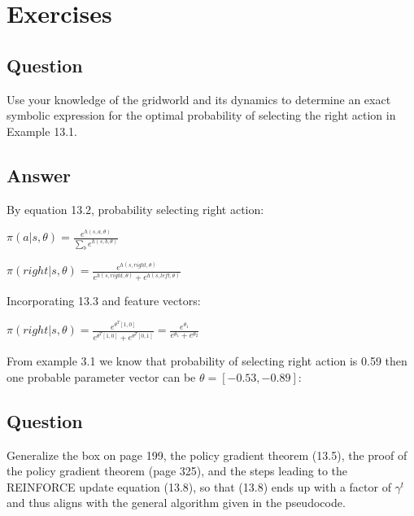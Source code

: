 \documentclass[11pt]{article}
\begin{document}
    \maketitle
    \setcounter{section}{12}

    \section{Exercises}

    \subsection{Question}

    Use your knowledge of the gridworld and its dynamics to determine an exact symbolic expression for the optimal probability of selecting the right action in Example 13.1.

    \subsection*{Answer}

    \noindent By equation 13.2, probability selecting right action:

    \noindent $ \pi( a | s, \theta) = \frac{e^{h(s,a,\theta)}}{\sum_{b} e^{h(s,b,\theta)}} $

    \noindent $ \pi( right | s, \theta) = \frac{e^{h(s,right,\theta)}}{e^{h(s,right,\theta)} + e^{h(s,left,\theta)}} $

    \hfill \break
    \noindent Incorporating 13.3 and feature vectors:

    \noindent $ \pi( right | s, \theta) = \frac{e^{\theta^{T}[1,0]}}{e^{{\theta^{T}[1,0]}} + e^{\theta^{T}[0,1]}} = \frac{e^{\theta_{1}}}{e^{{\theta_{1}}} + e^{\theta_{2}}} $

    \hfill \break
    \noindent From example 3.1 we know that probability of selecting right action is 0.59 then one probable parameter vector can be $ \theta = [-0.53, -0.89] $:

    \subsection{Question}

    Generalize the box on page 199, the policy gradient theorem (13.5), the proof of the policy gradient theorem (page 325), and the steps leading to the REINFORCE update equation (13.8), so that (13.8) ends up with a factor of $ \gamma^t $ and thus aligns with the general algorithm given in the pseudocode.
\end{document}
